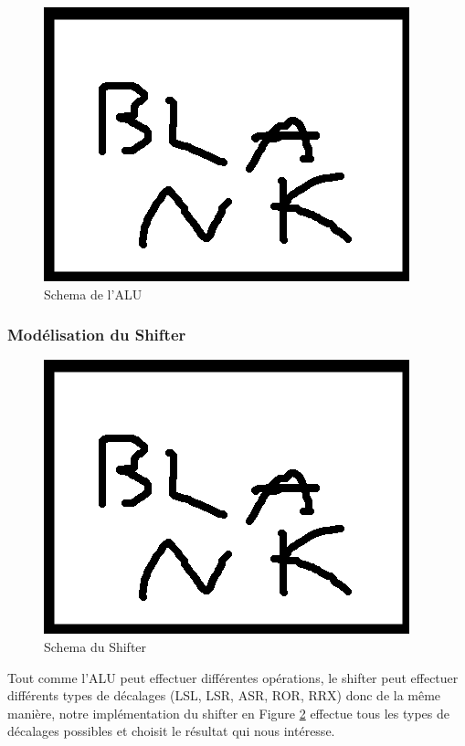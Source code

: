 \documentclass{article}
\begin{document}
\begin{figure}[ht]
\includegraphics[scale=1]{pics/blank.png}
\centering
\caption{Schema de l'ALU}
\label{alu}
\end{figure}

\subsubsection{Modélisation du Shifter}

\begin{figure}[H]
\includegraphics[scale=1]{pics/blank.png}
\centering
\caption{Schema du Shifter}
\label{shifter}
\end{figure}

Tout comme l'ALU peut effectuer différentes opérations, le shifter peut effectuer différents
types de décalages (LSL, LSR, ASR, ROR, RRX) donc de la même manière, notre implémentation
du shifter en Figure \ref{shifter} effectue tous les types de décalages possibles et choisit
le résultat qui nous intéresse.
\end{document}
